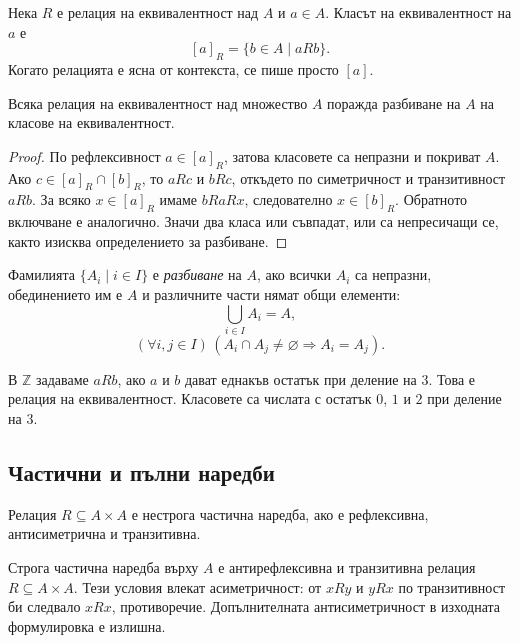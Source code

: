\begin{keydefn}
Нека $R$ е релация на еквивалентност над $A$ и $a\in A$. Класът на еквивалентност на $a$ е
\[
[a]_R=\{b\in A\mid aRb\}.
\]
Когато релацията е ясна от контекста, се пише просто $[a]$.
\end{keydefn}

\begin{thm}
Всяка релация на еквивалентност над множество $A$ поражда разбиване на $A$ на класове на еквивалентност.
\end{thm}

\begin{proof}
По рефлексивност $a\in[a]_R$, затова класовете са непразни и покриват $A$. Ако $c\in[a]_R\cap[b]_R$, то $aRc$ и $bRc$, откъдето по симетричност и транзитивност $aRb$. За всяко $x\in[a]_R$ имаме $bRaRx$, следователно $x\in[b]_R$. Обратното включване е аналогично. Значи два класа или съвпадат, или са непресичащи се, както изисква определението за разбиване.
\end{proof}

\begin{defn}
Фамилията $\{A_i\mid i\in I\}$ е \emph{разбиване} на $A$, ако всички $A_i$ са непразни, обединението им е $A$ и различните части нямат общи елементи:
\[
\bigcup_{i\in I}A_i=A,
\]
\[
(\forall i,j\in I)\,
(A_i\cap A_j\neq\varnothing\Rightarrow A_i=A_j).
\]
\end{defn}

\begin{example}
В $\mathbb Z$ задаваме $aRb$, ако $a$ и $b$ дават еднакъв остатък при деление на $3$. Това е релация на еквивалентност. Класовете са числата с остатък $0$, $1$ и $2$ при деление на $3$.
\end{example}

\subsection{Частични и пълни наредби}\label{s:1.5.3}

\begin{keydefn}
Релация $R\subseteq A\times A$ е нестрога частична наредба, ако е рефлексивна, антисиметрична и транзитивна.
\end{keydefn}

\begin{defn}
Строга частична наредба върху $A$ е антирефлексивна и транзитивна релация $R\subseteq A\times A$. Тези условия влекат асиметричност: от $xRy$ и $yRx$ по транзитивност би следвало $xRx$, противоречие. Допълнителната антисиметричност в изходната формулировка е излишна.
\end{defn}

